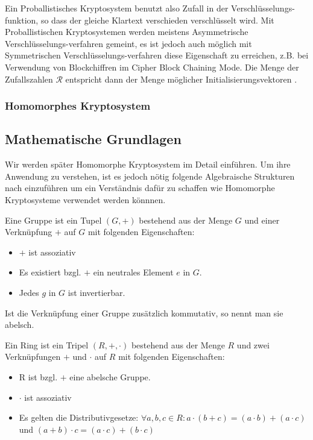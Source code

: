 \documentclass[12pt,a4paper]{scrartcl}	%
\begin{document}
	Ein Proballistisches Kryptosystem benutzt also Zufall in der Verschlüsselungs-funktion, so dass der gleiche Klartext verschieden verschlüsselt wird. Mit Proballistischen Kryptosystemen werden meistens Asymmetrische Verschlüsselungs-verfahren gemeint, es ist jedoch auch möglich mit Symmetrischen Verschlüsselungs-verfahren diese Eigenschaft zu erreichen, z.B. bei Verwendung von Blockchiffren im Cipher Block Chaining Mode. Die Menge der Zufallszahlen $\mathcal{R}$ entspricht dann der Menge möglicher Initialisierungsvektoren \cite{mm2015itsec}. 




\subsubsection{Homomorphes Kryptosystem}

\subsection{Mathematische Grundlagen}

Wir werden später Homomorphe Kryptosystem im Detail einführen. Um ihre Anwendung zu verstehen, ist es jedoch nötig folgende Algebraische Strukturen nach \cite{tr2015la} einzuführen um ein Verständnis dafür zu schaffen wie Homomorphe Kryptosysteme verwendet werden könnnen.

\begin{theorem}[Gruppe]
Eine Gruppe ist ein Tupel $(G,+)$ bestehend aus der Menge $G$ und einer Verknüpfung $+$ auf $G$ mit folgenden Eigenschaften:
\begin{itemize}
	\item $+$ ist assoziativ
	\item Es existiert bzgl. $+$ ein neutrales Element $e$ in $G$.
	\item Jedes $g$ in $G$ ist invertierbar.
\end{itemize}

Ist die Verknüpfung einer Gruppe zusätzlich kommutativ, so nennt man sie abelsch.

\end{theorem}

\begin{theorem}[Ring]
\label{Ring}
Ein Ring ist ein Tripel $(R,+,\cdot)$ bestehend aus der Menge $R$ und zwei Verknüpfungen $+$ und $\cdot$ auf $R$ mit folgenden Eigenschaften:
\begin{itemize}
	\item R ist bzgl. $+$ eine abelsche Gruppe.
	\item $\cdot$ ist assoziativ
	\item Es gelten die Distributivgesetze: $\forall a,b,c\in R: a\cdot(b+c)=(a\cdot b)+(a\cdot c)$ und $(a+b)\cdot c = (a\cdot c)+(b\cdot c)$
\end{itemize}
\end{theorem}
\end{document}
